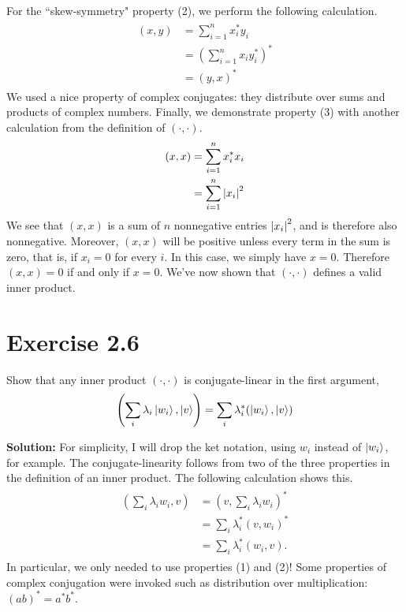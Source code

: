 \documentclass{book}
\begin{document}
    For the ``skew-symmetry" property (2), we perform the following calculation.
    \begin{align}
    \begin{aligned}
        (x, y) &= \sum_{i=1}^n x_i^* y_i \\
        &= \left(\sum_{i=1}^n x_i y_i^*\right)^* \\
        &= (y, x)^*
    \end{aligned}
    \end{align}
    We used a nice property of complex conjugates: they distribute over sums and products of complex numbers. Finally, we demonstrate property (3) with another calculation from the definition of $(\cdot, \cdot)$.
    \begin{align}
    \begin{aligned}
        (x, x) &= \sum_{i=1}^n x_i^* x_i \\
        &= \sum_{i=1}^n \abs{x_i}^2
    \end{aligned}
    \end{align}
    We see that $(x,x)$ is a sum of $n$ nonnegative entries $\abs{x_i}^2$, and is therefore also nonnegative. Moreover, $(x,x)$ will be positive unless every term in the sum is zero, that is, if $x_i = 0$ for every $i$. In this case, we simply have $x = 0$. Therefore $(x,x) = 0$ if and only if $x = 0$. We've now shown that $(\cdot, \cdot)$ defines a valid inner product.
    
\section*{Exercise 2.6}
    Show that any inner product $(\cdot, \cdot)$ is conjugate-linear in the first argument,
    \begin{align}
        \left(\sum_i \lambda_i \ket{w_i}, \ket{v}\right) = \sum_i \lambda_i^* (\ket{w_i}, \ket{v})
    \end{align}
    
    \textbf{Solution:} For simplicity, I will drop the ket notation, using $w_i$ instead of $\ket{w_i}$, for example. The conjugate-linearity follows from two of the three properties in the definition of an inner product. The following calculation shows this.
    \begin{align}
    \begin{aligned}
        \left(\sum_i \lambda_i w_i, v\right) &= \left(v, \sum_i \lambda_i w_i\right)^* \\
        &= \sum_i \lambda_i^* (v, w_i)^* \\
        &= \sum_i \lambda_i^* (w_i, v).
    \end{aligned}
    \end{align}
    In particular, we only needed to use properties (1) and (2)! Some properties of complex conjugation were invoked such as distribution over multiplication: $(ab)^* = a^* b^*$.
    
\end{document}

